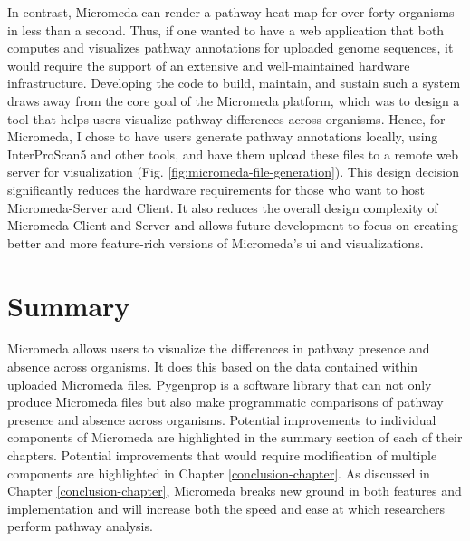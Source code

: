 In contrast, Micromeda can render a pathway heat map for over forty organisms in less than a second. Thus, if one wanted to have a web application that both computes and visualizes pathway annotations for uploaded genome sequences, it would require the support of an extensive and well-maintained hardware infrastructure. Developing the code to build, maintain, and sustain such a system draws away from the core goal of the Micromeda platform, which was to design a tool that helps users visualize pathway differences across organisms. Hence, for Micromeda, I chose to have users generate pathway annotations locally, using InterProScan5 and other tools, and have them upload these files to a remote web server for visualization (Fig. \ref{fig:micromeda-file-generation}). This design decision significantly reduces the hardware requirements for those who want to host Micromeda-Server and Client. It also reduces the overall design complexity of Micromeda-Client and Server and allows future development to focus on creating better and more feature-rich versions of Micromeda's \gls{ui} and visualizations.

\section{Summary} \label{introduction_summary}

Micromeda allows users to visualize the differences in pathway presence and absence across organisms. It does this based on the data contained within uploaded Micromeda files. Pygenprop is a software library that can not only produce Micromeda files but also make programmatic comparisons of pathway presence and absence across organisms. Potential improvements to individual components of Micromeda are highlighted in the summary section of each of their chapters. Potential improvements that would require modification of multiple components are highlighted in Chapter \ref{conclusion-chapter}. As discussed in Chapter \ref{conclusion-chapter}, Micromeda breaks new ground in both features and implementation and will increase both the speed and ease at which researchers perform pathway analysis.